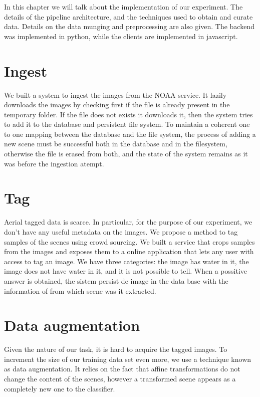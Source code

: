 In this chapter we will talk about the implementation of our experiment. The details of the pipeline architecture, and the techniques used to obtain and curate data. Details on the data munging and preprocessing are also given. The backend was implemented in python, while the clients are implemented in javascript. 

\section{Ingest}

We built a system to ingest the images from the NOAA service. It lazily downloads the images by checking first if the file is already present in the temporary folder. If the file does not exists it downloads it, then the system tries to add it to the database and persistent file system. To maintain a coherent one to one mapping between the database and the file system, the process of adding a new scene must be successful both in the database and in the filesystem, otherwise the file is erased from both, and the state of the system remains as it was before the ingestion atempt.

\section{Tag}

Aerial tagged data is scarce. In particular, for the purpose of our experiment, we don't have any useful metadata on the images. We propose a method to tag samples of the scenes using crowd sourcing. We built a service that crops samples from the images and exposes them to a online application that lets any user with access to tag an image. We have three categories: the image has water in it, the image does not have water in it, and it is not possible to tell. When a possitive answer is obtained, the sistem persist de image in the data base with the information of from which scene was it extracted.

\section{Data augmentation}

Given the nature of our task, it is hard to acquire the tagged images. To increment the size of our training data set even more, we use a technique known as data augmentation. It relies on the fact that affine transformations do not change the content of the scenes, however a transformed scene appears as a completely new one to the classifier. 

